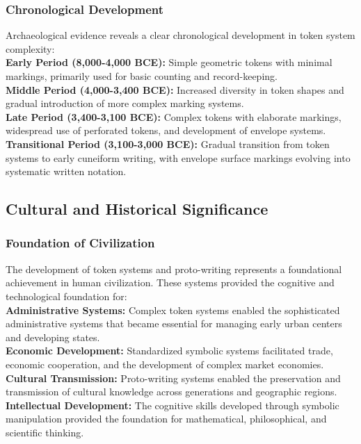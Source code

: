 \documentclass[12pt, oneside, openany]{book}
\begin{document}
\subsubsection{Chronological Development}

Archaeological evidence reveals a clear chronological development in token system complexity:\\
\textbf{Early Period (8,000-4,000 BCE):} Simple geometric tokens with minimal markings, primarily used for basic counting and record-keeping.\\
\textbf{Middle Period (4,000-3,400 BCE):} Increased diversity in token shapes and gradual introduction of more complex marking systems.\\
\textbf{Late Period (3,400-3,100 BCE):} Complex tokens with elaborate markings, widespread use of perforated tokens, and development of envelope systems.\\
\textbf{Transitional Period (3,100-3,000 BCE):} Gradual transition from token systems to early cuneiform writing, with envelope surface markings evolving into systematic written notation.

\subsection{Cultural and Historical Significance}

\subsubsection{Foundation of Civilization}

The development of token systems and proto-writing represents a foundational achievement in human civilization. These systems provided the cognitive and technological foundation for:\\
\textbf{Administrative Systems:} Complex token systems enabled the sophisticated administrative systems that became essential for managing early urban centers and developing states.\\
\textbf{Economic Development:} Standardized symbolic systems facilitated trade, economic cooperation, and the development of complex market economies.\\
\textbf{Cultural Transmission:} Proto-writing systems enabled the preservation and transmission of cultural knowledge across generations and geographic regions.\\
\textbf{Intellectual Development:} The cognitive skills developed through symbolic manipulation provided the foundation for mathematical, philosophical, and scientific thinking.
\end{document}
